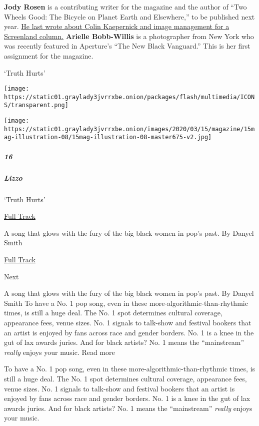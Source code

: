 \textbf{Jody Rosen} is a contributing writer for the magazine and the
author of ``Two Wheels Good: The Bicycle on Planet Earth and
Elsewhere,'' to be published next year.
\href{https://www.nytimes3xbfgragh.onion/2019/12/12/magazine/colin-kaepernick-nfl-video.html}{He
last wrote about Colin Kaepernick and image management for a Screenland
column.} \textbf{Arielle Bobb-Willis} is a photographer from New York
who was recently featured in Aperture's ``The New Black Vanguard.'' This
is her first assignment for the magazine.

`Truth Hurts'

\texttt{[image: https://static01.graylady3jvrrxbe.onion/packages/flash/multimedia/ICONS/transparent.png]}

\texttt{[image: https://static01.graylady3jvrrxbe.onion/images/2020/03/15/magazine/15mag-illustration-08/15mag-illustration-08-master675-v2.jpg]}

\hypertarget{16}{%
\subparagraph{16}\label{16}}

\hypertarget{lizzo}{%
\subparagraph{Lizzo}\label{lizzo}}

`Truth Hurts'

\href{https://open.spotify.com/track/3HWzoMvoF3TQfYg4UPszDq?si=RPQGRXusQpmcP9Yld2uDyA}{
Full Track}

A song that glows with the fury of the big black women in pop's past. By
Danyel Smith

\href{https://open.spotify.com/track/3HWzoMvoF3TQfYg4UPszDq?si=RPQGRXusQpmcP9Yld2uDyA}{Full
Track }

Next

A song that glows with the fury of the big black women in pop's past. By
Danyel Smith To have a No. 1 pop song, even in these
more-algorithmic-than-rhythmic times, is still a huge deal. The No. 1
spot determines cultural coverage, appearance fees, venue sizes. No. 1
signals to talk-show and festival bookers that an artist is enjoyed by
fans across race and gender borders. No. 1 is a knee in the gut of lax
awards juries. And for black artists? No. 1 means the ``mainstream''
\emph{really} enjoys your music. Read more

To have a No. 1 pop song, even in these more-algorithmic-than-rhythmic
times, is still a huge deal. The No. 1 spot determines cultural
coverage, appearance fees, venue sizes. No. 1 signals to talk-show and
festival bookers that an artist is enjoyed by fans across race and
gender borders. No. 1 is a knee in the gut of lax awards juries. And for
black artists? No. 1 means the ``mainstream'' \emph{really} enjoys your
music.

